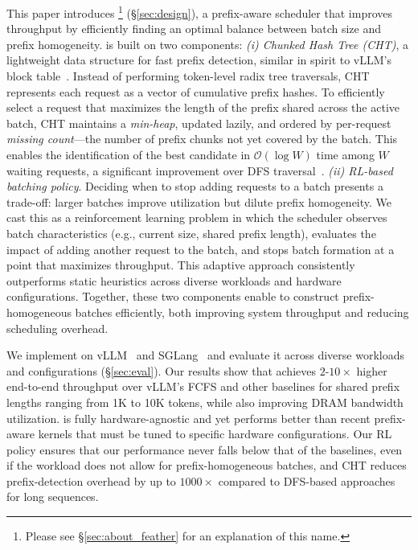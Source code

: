 This paper introduces \Feather\footnote{Please see \S\ref{sec:about_feather} for an explanation of this name.} (\S\ref{sec:design}), a prefix-aware scheduler that improves throughput by efficiently finding an optimal balance between batch size and prefix homogeneity. \Feather is built on two components: \textit{(i) Chunked Hash Tree (CHT)}, a lightweight data structure for fast prefix detection, similar in spirit to vLLM's block table~\cite{kwon2023efficient}. Instead of performing token-level radix tree traversals, CHT represents each request as a vector of cumulative prefix hashes. To efficiently select a request that maximizes the length of the prefix shared across the active batch, CHT maintains a \textit{min-heap}, updated lazily, and ordered by per-request \textit{missing count}---the number of prefix chunks not yet covered by the batch. This enables the identification of the best candidate in $\mathcal{O}(\log W)$ time among $W$ waiting requests, a significant improvement over DFS traversal~\cite{zheng2024sglangefficientexecutionstructured}. \textit{(ii) RL-based batching policy}. Deciding when to stop adding requests to a batch presents a trade-off: larger batches improve utilization but dilute prefix homogeneity. We cast this as a reinforcement learning problem in which the scheduler observes batch characteristics (e.g., current size, shared prefix length), evaluates the impact of adding another request to the batch, and stops batch formation at a point that maximizes throughput. This adaptive approach consistently outperforms static heuristics across diverse workloads and hardware configurations. Together, these two components enable \Feather to construct prefix-homogeneous batches efficiently, both improving system throughput and reducing scheduling overhead.

We implement \Feather on vLLM~\cite{kwon2023efficient} and SGLang~\cite{zheng2024sglangefficientexecutionstructured} and evaluate it across diverse workloads and configurations (\S\ref{sec:eval}). Our results show that \Feather achieves $2$-$10\times$ higher end-to-end throughput over vLLM's FCFS and other baselines for shared prefix lengths ranging from 1K to 10K tokens, while also improving DRAM bandwidth utilization. \Feather is fully hardware-agnostic and yet performs better than recent prefix-aware kernels that must be tuned to specific hardware configurations. 
Our RL policy ensures that our performance never falls below that of the baselines, even if the workload does not allow for prefix-homogeneous batches, and CHT reduces prefix-detection overhead by up to $1000\times$ compared to DFS-based approaches for long sequences. 

